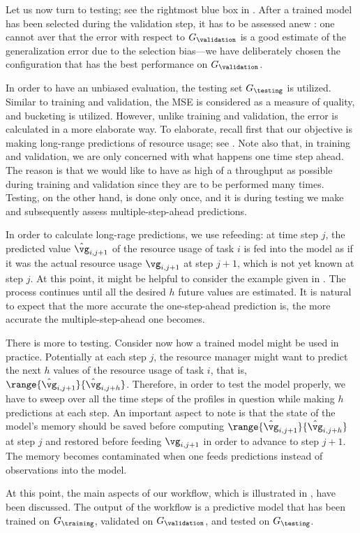 Let us now turn to testing; see the rightmost blue box in .
After a trained model has been selected during the validation step, it has to be
assessed anew \cite{hastie2013}: one cannot aver that the error with respect to
$G_\validation$ is a good estimate of the generalization error due to the
selection bias---we have deliberately chosen the configuration that has the best
performance on $G_\validation$.

In order to have an unbiased evaluation, the testing set $G_\testing$ is
utilized. Similar to training and validation, the \ac{MSE} is considered as a
measure of quality, and bucketing is utilized. However, unlike training and
validation, the error is calculated in a more elaborate way. To elaborate,
recall first that our objective is making long-range predictions of resource
usage; see . Note also that, in training and validation, we
are only concerned with what happens one time step ahead. The reason is that we
would like to have as high of a throughput as possible during training and
validation since they are to be performed many times. Testing, on the other
hand, is done only once, and it is during testing we make and subsequently
assess multiple-step-ahead predictions.

In order to calculate long-rage predictions, we use refeeding: at time step $j$,
the predicted value $\hat{\vg}_{i, j + 1}$ of the resource usage of task $i$ is
fed into the model as if it was the actual resource usage $\vg_{i, j + 1}$ at
step $j + 1$, which is not yet known at step $j$. At this point, it might be
helpful to consider the example given in . The process
continues until all the desired $h$ future values are estimated. It is natural
to expect that the more accurate the one-step-ahead prediction is, the more
accurate the multiple-step-ahead one becomes.

There is more to testing. Consider now how a trained model might be used in
practice. Potentially at each step $j$, the resource manager might want to
predict the next $h$ values of the resource usage of task $i$, that is,
$\range{\hat{\vg}_{i, j + 1}}{\hat{\vg}_{i, j + h}}$. Therefore, in order to
test the model properly, we have to sweep over all the time steps of the
profiles in question while making $h$ predictions at each step. An important
aspect to note is that the state of the model's memory should be saved before
computing $\range{\hat{\vg}_{i, j + 1}}{\hat{\vg}_{i, j + h}}$ at step $j$ and
restored before feeding $\vg_{i, j + 1}$ in order to advance to step $j + 1$.
The memory becomes contaminated when one feeds predictions instead of
observations into the model.

At this point, the main aspects of our workflow, which is illustrated in
, have been discussed. The output of the workflow is a
predictive model that has been trained on $G_\training$, validated on
$G_\validation$, and tested on $G_\testing$.
